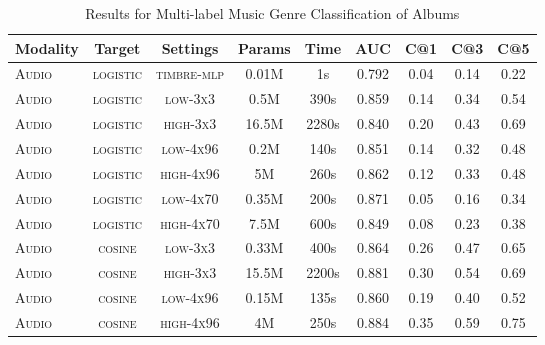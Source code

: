 \documentclass{article}
\begin{document}
\begin{table*}[ht]
\centering
\begin{threeparttable}
\scriptsize
\caption{Results for Multi-label Music Genre Classification of Albums}
\label{tbl:results}
\begin{tabular}{lcccccccc}
Modality & Target & Settings                & Params         & Time    & AUC        & C@1           & C@3           & C@5           \\
\toprule
\textsc{Audio} & \textsc{logistic} & \textsc{timbre-mlp}                   &  0.01M              & 1s              & 0.792               & 0.04             & 0.14              & 0.22        \\
\textsc{Audio} & \textsc{logistic} & \textsc{low-3x3}           & 0.5M           & 390s          & 0.859          & 0.14          & 0.34          & 0.54          \\
\textsc{Audio} & \textsc{logistic} & \textsc{high-3x3}          & 16.5M          & 2280s         & 0.840          & 0.20          & 0.43          & 0.69          \\
\textsc{Audio} & \textsc{logistic} & \textsc{low-4x96}          & 0.2M           & 140s          & 0.851          & 0.14          & 0.32          & 0.48          \\
\textsc{Audio} & \textsc{logistic} & \textsc{high-4x96}         & 5M             & 260s          & 0.862          & 0.12          & 0.33          & 0.48          \\
\textsc{Audio} & \textsc{logistic} & \textsc{low-4x70} & 0.35M & 200s & 0.871 & 0.05 & 0.16 & 0.34 \\
\textsc{Audio} & \textsc{logistic} & \textsc{high-4x70}         & 7.5M           & 600s          & 0.849          & 0.08          & 0.23          & 0.38          \\
\textsc{Audio} & \textsc{cosine} & \textsc{low-3x3}            & 0.33M          & 400s          & 0.864          & 0.26          & 0.47          & 0.65          \\
\textsc{Audio} & \textsc{cosine} & \textsc{high-3x3}           & 15.5M          & 2200s         & 0.881          & 0.30          & 0.54          & 0.69          \\
\textsc{Audio} & \textsc{cosine} & \textsc{low-4x96}           & 0.15M          & 135s          & 0.860          & 0.19          & 0.40          & 0.52          \\
\textsc{Audio} & \textsc{cosine} & \textsc{high-4x96}          & 4M             & 250s          & 0.884          & 0.35          & 0.59          & 0.75          \\

\end{tabular}
\end{threeparttable}
\end{table*}
\end{document}
